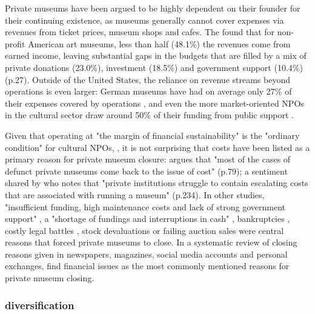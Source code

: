 \documentclass[12pt]{article}
\begin{document}
Private museums have been argued to be highly dependent on their founder for their continuing existence, as museums generally cannot cover expenses via revenues from ticket prices, museum shops and cafes.
The \textcite{IMLS_2008_funding} found that for non-profit American art museums, less than half (48.1\%) the revenues come from earned income, leaving substantial gaps in the budgets that are filled by a mix of private donations (23.0\%), investment (18.5\%) and government support (10.4\%) (p.27).
Outside of the United States, the reliance on revenue streams beyond operations is even larger:
German museums have had on average only 27\% of their expenses covered by operations \parencite[p.233]{Martin_1993_museen}, and even the more market-oriented NPOs in the cultural sector draw around 50\% of their funding from public support \parencite[p.82]{Zimmer_Priller_2007_gemeinnuetzig}.


Given that operating at "the margin of financial sustainability" is the "ordinary condition" for cultural NPOs, \cite[p.2]{Licci_BaraldiBonini_2024_sustainability}, it is not surprising that costs have been listed as a primary reason for private museum closure:
\textcite{Adam_2021_rise} argues that "most of the cases of defunct private museums come back to the issue of cost" (p.79); a sentiment shared by \textcite{Walker_2019_collector} who notes that "private institutions struggle to contain escalating costs that are associated with running a museum" (p.234).
In other studies, "insufficient funding, high maintenance costs and lack of strong government support" \parencite[p.7]{Zennaro_2017_shanghai}, a "shortage of fundings and interruptions in cash" \parencite[p.45]{Song_2008_private}, bankruptcies \parencite{Velthuis_Gera_2024_fragility,Liu_2019_identities,DeNigris_2018_museums}, costly legal battles \parencite{Velthuis_Gera_2024_fragility}, stock devaluations \parencite{Walker_2019_collector} or failing auction sales \parencite{Bechtler_Imhof_2018_future} were central reasons that forced private museums to close.
In a systematic review of closing reasons given in newspapers, magazines, social media accounts and personal exchanges, \textcite{Velthuis_Gera_2024_fragility} find financial issues as the most commonly mentioned reasons for private museum closing.
\subsubsection*{diversification}
\end{document}
